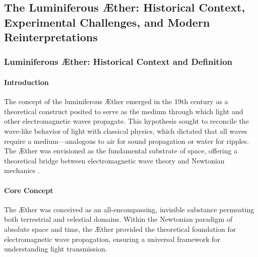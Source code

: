 \documentclass[a4paper,10pt]{article}
\begin{document}
    
    \subsection{The Luminiferous Æther: Historical Context, Experimental Challenges, and Modern Reinterpretations}

    \subsubsection*{Luminiferous Æther: Historical Context and Definition}
    \paragraph*{Introduction}
    The concept of the luminiferous Æther emerged in the 19th century as a theoretical construct posited to serve as the medium through which light and other electromagnetic waves propagate. This hypothesis sought to reconcile the wave-like behavior of light with classical physics, which dictated that all waves require a medium—analogous to air for sound propagation or water for ripples. The Æther was envisioned as the fundamental substrate of space, offering a theoretical bridge between electromagnetic wave theory and Newtonian mechanics \cite{young1801, maxwell1865, michelson1887, einstein1905, higgs1964}.

    \paragraph*{Core Concept}
    The Æther was conceived as an all-encompassing, invisible substance permeating both terrestrial and celestial domains. Within the Newtonian paradigm of absolute space and time, the Æther provided the theoretical foundation for electromagnetic wave propagation, ensuring a universal framework for understanding light transmission.
\end{document}
